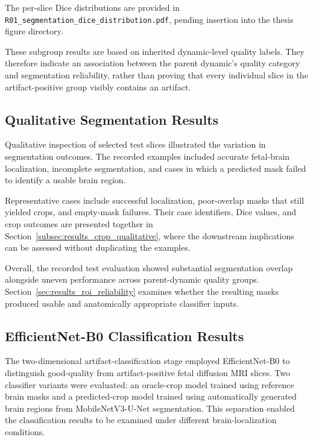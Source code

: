 The per-slice Dice distributions are provided in \texttt{R01\_segmentation\_dice\_distribution.pdf}, pending insertion into the thesis figure directory.

These subgroup results are based on inherited dynamic-level quality labels. They therefore indicate an association between the parent dynamic's quality category and segmentation reliability, rather than proving that every individual slice in the artifact-positive group visibly contains an artifact.

\subsection{Qualitative Segmentation Results}
\label{subsec:results_2d_segmentation_qualitative}

Qualitative inspection of selected test slices illustrated the variation in segmentation outcomes. The recorded examples included accurate fetal-brain localization, incomplete segmentation, and cases in which a predicted mask failed to identify a usable brain region.

Representative cases include successful localization, poor-overlap masks that still yielded crops, and empty-mask failures. Their case identifiers, Dice values, and crop outcomes are presented together in Section~\ref{subsec:results_crop_qualitative}, where the downstream implications can be assessed without duplicating the examples.

Overall, the recorded test evaluation showed substantial segmentation overlap alongside uneven performance across parent-dynamic quality groups. Section~\ref{sec:results_roi_reliability} examines whether the resulting masks produced usable and anatomically appropriate classifier inputs.

\subsection{EfficientNet-B0 Classification Results}
\label{sec:results_2d_classification}

The two-dimensional artifact-classification stage employed EfficientNet-B0 to distinguish good-quality from artifact-positive fetal diffusion MRI slices. Two classifier variants were evaluated: an oracle-crop model trained using reference brain masks and a predicted-crop model trained using automatically generated brain regions from MobileNetV3-U-Net segmentation. This separation enabled the classification results to be examined under different brain-localization conditions.

